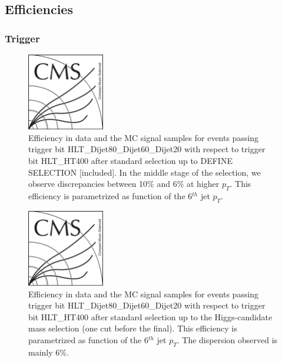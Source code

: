 
\subsection{Efficiencies}
\label{sec:eff}

\subsubsection{Trigger}
\label{sec:trigger_ana}

\begin{figure}[!Hhtbp]
  \begin{center}
    \includegraphics[width=0.3\textwidth]{figs/CMSlogo.png}
    \caption{Efficiency in data and the MC signal samples for events passing trigger bit HLT\_Dijet80\_Dijet60\_Dijet20 with respect to trigger bit HLT\_HT400 after standard selection up to DEFINE SELECTION [included]. In the middle stage of the selection, we observe discrepancies between 10\% and 6\% at higher $p_{T}$. This efficiency is parametrized as function of the 6$^{th}$ jet $p_{T}$.}
    \label{fig:TrigEff}
  \end{center}
\end{figure}\clearpage

\begin{figure}[!Hhtbp]
  \begin{center}
    \includegraphics[width=0.3\textwidth]{figs/CMSlogo.png}
    \caption{Efficiency in data and the MC signal samples for events passing trigger bit HLT\_Dijet80\_Dijet60\_Dijet20 with respect to trigger bit HLT\_HT400 after standard selection up to the Higgs-candidate mass selection (one cut before the final). This efficiency is parametrized as function of the 6$^{th}$ jet $p_{T}$. The dispersion observed is mainly 6\%.}
    \label{fig:TrigEffPostDalitz}
  \end{center}
\end{figure}\clearpage

